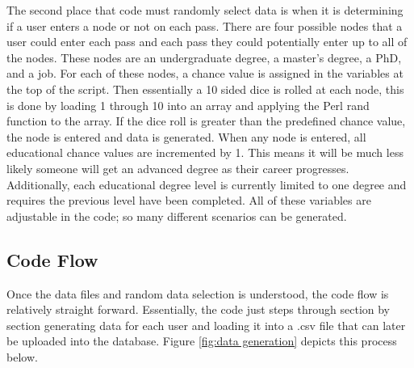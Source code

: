 The second place that code must randomly select data is when it is determining
if a user enters a node or not on each pass.  There are four possible nodes that
a user could enter each pass and each pass they could potentially enter up to
all of the nodes.  These nodes are an undergraduate degree, a master's degree, a
PhD, and a job.  For each of these nodes, a chance value is assigned in the
variables at the top of the script.  Then essentially a 10 sided dice is rolled
at each node, this is done by loading 1 through 10 into an array and applying
the Perl rand function to the array.  If the dice roll is greater than the
predefined chance value, the node is entered and data is generated.  When any
node is entered, all educational chance values are incremented by 1.  This means
it will be much less likely someone will get an advanced degree as their career
progresses.  Additionally, each educational degree level is currently limited to
one degree and requires the previous level have been completed.  All of these
variables are adjustable in the code; so many different scenarios can be
generated.


\subsection{Code Flow}
Once the data files and random data selection is understood, the code flow is
relatively straight forward.  Essentially, the code just steps through section
by section generating data for each user and loading it into a .csv file that
can later be uploaded into the database.  Figure \ref {fig:data generation}
depicts this process below.

\pagebreak
\usetikzlibrary{shapes,arrows,chains}

